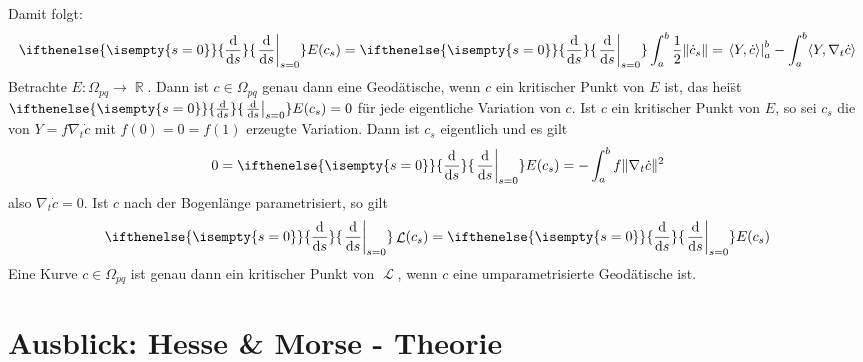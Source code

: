 \documentclass[paper=A4, twoside, chapterprefix=true, bibliography=totoc, headsepline]{scrbook}
\DeclareMathOperator{\R}{\mathbb{R}}
\DeclareMathOperator{\calL}{\mathcal{L}}
\newcommand{\dop}{\mathrm{d}}
\newcommand{\difffrac}[3][]{\ifthenelse{\isempty{#1}}{\frac{\dop #2}{\dop #3}}{\left. \frac{\dop #2}{\dop #3} \right|_{#1}}}
\theoremstyle{plain}
\theoremstyle{nonumberplain}
\theoremstyle{empty}
\theoremstyle{break}
\begin{document}
Damit folgt:
\begin{align*}
  \difffrac[s=0]{}{s} E(c_s) = \difffrac[s=0]{}{s} \int_a^b
  \frac{1}{2} \|\dot c_s\| = \left. \langle Y, \dot c \rangle
  \right|_a^b - \int_a^b \langle Y, \nabla_t \dot c \rangle
\end{align*}
Betrachte $E: \Omega_{pq} \to \R$. Dann ist $c \in \Omega_{pq}$ genau dann eine Geod\"atische, wenn $c$ ein kritischer Punkt von $E$ ist, das hei\"st $\difffrac[s=0]{}{s}E(c_s) = 0$ f\"ur jede eigentliche Variation von $c$.
Ist $c$ ein kritischer Punkt von $E$, so sei $c_s$ die von $Y = f \nabla_t \dot c$ mit $f(0) = 0 = f(1)$ erzeugte Variation.
Dann ist $c_s$ eigentlich und es gilt
\begin{align*}
  0 = \difffrac[s=0]{}{s} E(c_s) = - \int_a^b f \|\nabla_t \dot c\|^2
\end{align*}
also $\nabla_t \dot c = 0$.  Ist $c$ nach der Bogenl\"ange
parametrisiert, so gilt
\begin{align*}
  \difffrac[s=0]{}{s} \calL(c_s) = \difffrac[s=0]{}{s} E(c_s)
\end{align*}
Eine Kurve $c \in \Omega_{pq}$ ist genau dann ein kritischer Punkt von $\calL$, wenn $c$ eine umparametrisierte Geod\"atische ist.

\section{Ausblick: Hesse \& Morse - Theorie}
\end{document}
